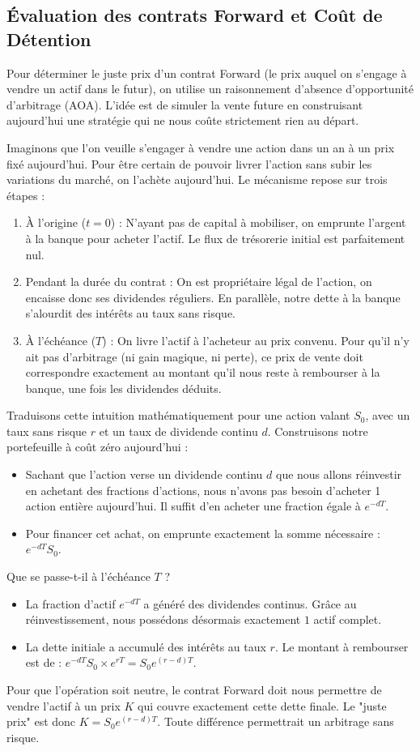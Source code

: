 \subsection{Évaluation des contrats Forward et Coût de Détention}

Pour déterminer le juste prix d'un contrat Forward (le prix auquel on s'engage à vendre un actif dans le futur), on utilise un raisonnement d'absence d'opportunité d'arbitrage (AOA). L'idée est de simuler la vente future en construisant aujourd'hui une stratégie qui ne nous coûte strictement rien au départ. 

Imaginons que l'on veuille s'engager à vendre une action dans un an à un prix fixé aujourd'hui. Pour être certain de pouvoir livrer l'action sans subir les variations du marché, on l'achète aujourd'hui. Le mécanisme repose sur trois étapes :
\begin{enumerate}
    \item À l'origine ($t=0$) : N'ayant pas de capital à mobiliser, on emprunte l'argent à la banque pour acheter l'actif. Le flux de trésorerie initial est parfaitement nul.
    \item Pendant la durée du contrat : On est propriétaire légal de l'action, on encaisse donc ses dividendes réguliers. En parallèle, notre dette à la banque s'alourdit des intérêts au taux sans risque.
    \item À l'échéance ($T$) : On livre l'actif à l'acheteur au prix convenu. Pour qu'il n'y ait pas d'arbitrage (ni gain magique, ni perte), ce prix de vente doit correspondre exactement au montant qu'il nous reste à rembourser à la banque, une fois les dividendes déduits. 
\end{enumerate}

Traduisons cette intuition mathématiquement pour une action valant $S_0$, avec un taux sans risque $r$ et un taux de dividende continu $d$.
Construisons notre portefeuille à coût zéro aujourd'hui :
\begin{itemize}[label=$\rightarrow$]
    \item Sachant que l'action verse un dividende continu $d$ que nous allons réinvestir en achetant des fractions d'actions, nous n'avons pas besoin d'acheter 1 action entière aujourd'hui. Il suffit d'en acheter une fraction égale à $e^{-dT}$.
    \item Pour financer cet achat, on emprunte exactement la somme nécessaire : $e^{-dT} S_0$.
\end{itemize}
Que se passe-t-il à l'échéance $T$ ?
\begin{itemize}[label=$\rightarrow$]
    \item La fraction d'actif $e^{-dT}$ a généré des dividendes continus. Grâce au réinvestissement, nous possédons désormais exactement $1$ actif complet.
    \item La dette initiale a accumulé des intérêts au taux $r$. Le montant à rembourser est de : $e^{-dT} S_0 \times e^{rT} = S_0 e^{(r-d)T}$.
\end{itemize}
Pour que l'opération soit neutre, le contrat Forward doit nous permettre de vendre l'actif à un prix $K$ qui couvre exactement cette dette finale. Le "juste prix" est donc $K = S_0 e^{(r-d)T}$. Toute différence permettrait un arbitrage sans risque.


